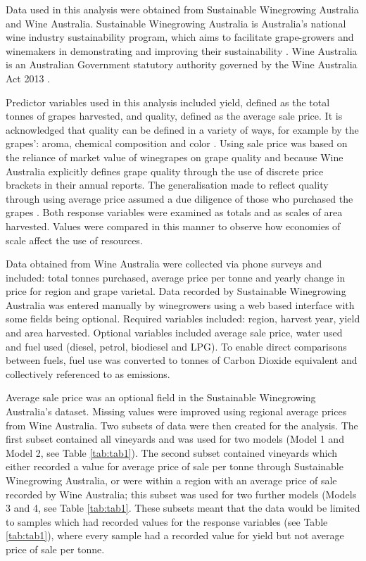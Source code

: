 \documentclass[review,12pt,authoryear]{elsarticle}
\begin{document}
\begin{linenumbers}
Data used in this analysis were obtained from Sustainable Winegrowing Australia and Wine Australia. Sustainable Winegrowing Australia is Australia's national wine industry sustainability program, which aims to facilitate grape-growers and winemakers in demonstrating and improving their sustainability \citep{swaSustainableWingrowingAustralia2022}. Wine Australia is an Australian Government statutory authority governed by the Wine Australia Act 2013 \citep{WineAustraliaAct2019}.
\par
Predictor variables used in this analysis included yield, defined as the total tonnes of grapes harvested, and quality, defined as the average sale price. It is acknowledged that quality can be defined in a variety of ways, for example by the grapes': aroma, chemical composition and color \citep{kasimatiPredictingGrapeSugar2022,mejeanperrotDecisionsupportSystemPredict2022,suarezAssessingWineGrape2021}. Using sale price was based on the reliance of market value of winegrapes on grape quality and because Wine Australia explicitly defines grape quality through the use of discrete price brackets in their annual reports. The generalisation made to reflect quality through using average price assumed a due diligence of those who purchased the grapes \citep{yeggeInfluenceSensoryNonsensory2001}. Both response variables were examined as totals and as scales of area harvested. Values were compared in this manner to observe how economies of scale affect the use of resources.
\par
Data obtained from Wine Australia were collected via phone surveys and included: total tonnes purchased, average price per tonne and yearly change in price for region and grape varietal. Data recorded by Sustainable Winegrowing Australia was entered manually by winegrowers using a web based interface with some fields being optional. Required variables included: region, harvest year, yield and area harvested. Optional variables included average sale price, water used and fuel used (diesel, petrol, biodiesel and LPG). To enable direct comparisons between fuels, fuel use was converted to tonnes of Carbon Dioxide equivalent and collectively referenced to as emissions.
\par
Average sale price was an optional field in the Sustainable Winegrowing Australia's dataset. 
Missing values were improved using regional average prices from Wine Australia. Two subsets of data were then created for the analysis. The first subset contained all vineyards and was used for two models (Model 1 and Model 2, see Table \ref{tab:tab1}). The second subset contained vineyards which either recorded a value for average price of sale per tonne through Sustainable Winegrowing Australia, or were within a region with an average price of sale recorded by Wine Australia; this subset was used for two further models (Models 3 and 4, see Table \ref{tab:tab1}. These subsets meant that the data would be limited to samples which had recorded values for the response variables (see Table \ref{tab:tab1}), where every sample had a recorded value for yield but not average price of sale per tonne.

\end{linenumbers}
\end{document}
